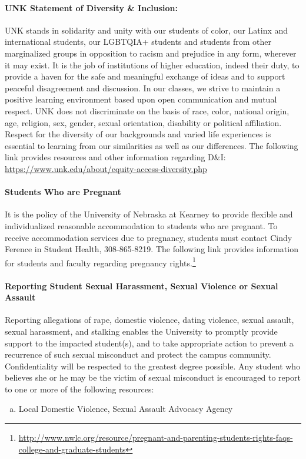 \documentclass[12pt]{article}
\newcounter{ex}\setcounter{ex}{0}
\newenvironment{alphalist}{
  \begin{enumerate}[(a)]
    \addtolength{\itemsep}{-0.5\itemsep}}
  {\end{enumerate}}
\begin{document}
\begin{enumerate}
\paragraph{UNK Statement of Diversity \& Inclusion:} UNK stands in solidarity and unity with our students of color, our Latinx and international students, our LGBTQIA+ students and students from other marginalized groups in opposition to racism and prejudice in any form, wherever it may exist. It is the job of institutions of higher education, indeed their duty, to provide a haven for the safe and meaningful exchange of ideas and to support peaceful disagreement and discussion. In our classes, we strive to maintain a positive learning environment based upon open communication and mutual respect. UNK does not discriminate on the basis of race, color, national origin, age, religion, sex, gender, sexual orientation, disability or political affiliation. Respect for the diversity of our backgrounds and varied 
life experiences is essential to learning from our similarities as well as our differences. The following link provides resources and other information regarding D\&I: 
\url{https://www.unk.edu/about/equity-access-diversity.php}

\paragraph{Students Who are Pregnant} It is the policy of the University of Nebraska at Kearney to provide flexible and individualized reasonable accommodation to students who are pregnant. To receive accommodation services due to pregnancy, students must contact Cindy Ference in Student Health, 308-865-8219. The following link provides information for students and faculty regarding pregnancy rights.\footnote{\small  \url{http://www.nwlc.org/resource/pregnant-and-parenting-students-rights-faqs-college-and-graduate-students}}

\paragraph{Reporting Student Sexual Harassment, Sexual Violence or Sexual Assault} Reporting allegations of rape, domestic violence, dating violence, sexual assault, sexual harassment, and stalking enables the University to promptly provide support to the impacted student(s), and to take appropriate action to prevent a recurrence of such sexual misconduct and protect the campus community. Confidentiality will be respected to the greatest degree possible. Any student who believes she or he may be the victim of sexual misconduct is encouraged to report to one or more of the following resources:
\begin{alphalist}
\item Local Domestic Violence, Sexual Assault Advocacy Agency 


\end{alphalist}
\end{enumerate}
\end{document}
